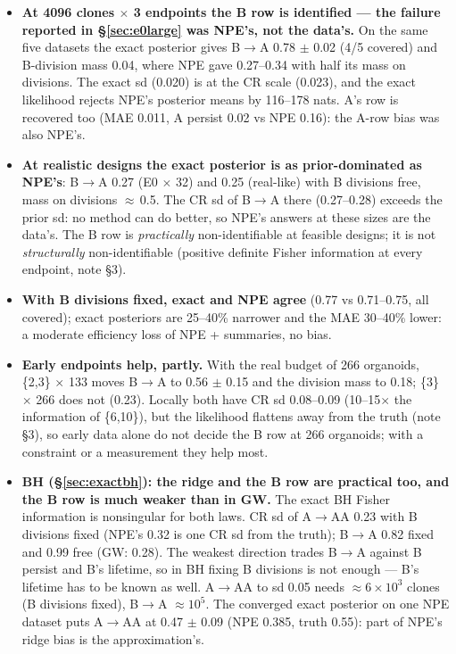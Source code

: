 \documentclass[10pt,a4paper]{article}
\newcommand{\sref}[1]{\S\ref{#1}}
\begin{document}
\begin{itemize}
\item \textbf{At 4096 clones $\times$ 3 endpoints the B row is identified --- the failure reported in \S\ref{sec:e0large} was NPE's, not the data's.} On the same five datasets the exact posterior gives B$\to$A 0.78 $\pm$ 0.02 (4/5 covered) and B-division mass 0.04, where NPE gave 0.27--0.34 with half its mass on divisions. The exact sd (0.020) is at the CR scale (0.023), and the exact likelihood rejects NPE's posterior means by 116--178 nats. A's row is recovered too (MAE 0.011, A persist 0.02 vs NPE 0.16): the A-row bias was also NPE's.
\item \textbf{At realistic designs the exact posterior is as prior-dominated as NPE's}: B$\to$A 0.27 (E0 $\times$ 32) and 0.25 (real-like) with B divisions free, mass on divisions $\approx$\,0.5. The CR sd of B$\to$A there (0.27--0.28) exceeds the prior sd: no method can do better, so NPE's answers at these sizes are the data's. The B row is \emph{practically} non-identifiable at feasible designs; it is not \emph{structurally} non-identifiable (positive definite Fisher information at every endpoint, note \S3).
\item \textbf{With B divisions fixed, exact and NPE agree} (0.77 vs 0.71--0.75, all covered); exact posteriors are 25--40\% narrower and the MAE 30--40\% lower: a moderate efficiency loss of NPE + summaries, no bias.
\item \textbf{Early endpoints help, partly.} With the real budget of 266 organoids, \{2,3\} $\times$ 133 moves B$\to$A to 0.56 $\pm$ 0.15 and the division mass to 0.18; \{3\} $\times$ 266 does not (0.23). Locally both have CR sd 0.08--0.09 (10--15$\times$ the information of \{6,10\}), but the likelihood flattens away from the truth (note \S3), so early data alone do not decide the B row at 266 organoids; with a constraint or a measurement they help most.
\item \textbf{BH (\sref{sec:exactbh}): the ridge and the B row are practical too, and the B row is much weaker than in GW.} The exact BH Fisher information is nonsingular for both laws. CR sd of A$\to$AA 0.23 with B divisions fixed (NPE's 0.32 is one CR sd from the truth); B$\to$A 0.82 fixed and 0.99 free (GW: 0.28). The weakest direction trades B$\to$A against B persist and B's lifetime, so in BH fixing B divisions is not enough --- B's lifetime has to be known as well. A$\to$AA to sd 0.05 needs $\approx 6\times10^3$ clones (B divisions fixed), B$\to$A $\approx 10^5$. The converged exact posterior on one NPE dataset puts A$\to$AA at 0.47 $\pm$ 0.09 (NPE 0.385, truth 0.55): part of NPE's ridge bias is the approximation's.

\end{itemize}
\end{document}
